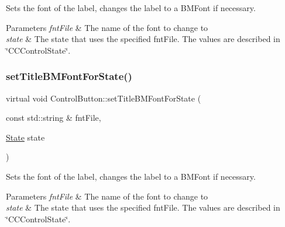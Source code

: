 Sets the font of the label, changes the label to a B\+M\+Font if necessary. 
\begin{DoxyParams}{Parameters}
{\em fnt\+File} & The name of the font to change to \\
\hline
{\em state} & The state that uses the specified fnt\+File. The values are described in \char`\"{}\+C\+C\+Control\+State\char`\"{}. \\
\hline
\end{DoxyParams}
\mbox{\label{classControlButton_a12e4a9d12d8eb9e267ac750cd14a1d91}} 
\subsubsection{\texorpdfstring{set\+Title\+B\+M\+Font\+For\+State()}{setTitleBMFontForState()}\hspace{0.1cm}{\footnotesize\ttfamily [2/2]}}
{\footnotesize\ttfamily virtual void Control\+Button\+::set\+Title\+B\+M\+Font\+For\+State (\begin{DoxyParamCaption}\item[{const std\+::string \&}]{fnt\+File,  }\item[{\hyperlink{classControl_a89e9598cd785841ac91cff3c4798c469}{State}}]{state }\end{DoxyParamCaption})\hspace{0.3cm}{\ttfamily [virtual]}}

Sets the font of the label, changes the label to a B\+M\+Font if necessary. 
\begin{DoxyParams}{Parameters}
{\em fnt\+File} & The name of the font to change to \\
\hline
{\em state} & The state that uses the specified fnt\+File. The values are described in \char`\"{}\+C\+C\+Control\+State\char`\"{}. \\
\hline
\end{DoxyParams}
\mbox{\label{classControlButton_ae0319a5b5a8758e6110aa13ead017321}} 
